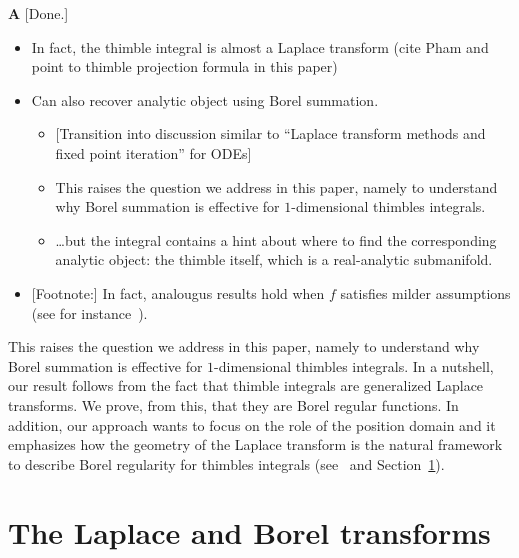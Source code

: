 \documentclass{article}
\theoremstyle{definition}
\theoremstyle{plain}
\newenvironment{todo}{\color{Coral}}{\color{black}}
\newenvironment{brainstorm}{\color{BlueViolet}\begin{itemize}}{\end{itemize}\color{black}}
\newenvironment{draft}{\color{SlateBlue}}{\color{black}}
\begin{document}
\begin{todo}\textbf{A} [Done.]\end{todo}

\begin{brainstorm}
\item In fact, the thimble integral is almost a Laplace transform (cite Pham and point to thimble projection formula in this paper)
\item Can also recover analytic object using Borel summation.
\begin{itemize}
\item {[Transition into discussion similar to ``Laplace transform methods and fixed point iteration'' for ODEs]}
\item This raises the question we address in this paper, namely to understand why Borel summation is effective for $1$-dimensional thimbles integrals.
\item \ldots but the integral contains a hint about where to find the corresponding analytic object: the thimble itself, which is a real-analytic submanifold.
\end{itemize}
\item {[Footnote:]} In fact, analougus results hold when $f$ satisfies milder assumptions (see for instance~\cite[Section 1.2.2]{mistegard_phdthesis}).
\end{brainstorm}

\begin{draft}This raises the question we address in this paper, namely to understand why Borel summation is effective for $1$-dimensional thimbles integrals. In a nutshell, our result follows from the fact that thimble integrals are generalized Laplace transforms. We prove, from this, that they are Borel regular functions. In addition, our approach wants to focus on the role of the position domain and it emphasizes how the geometry of the Laplace transform is the natural framework to describe Borel regularity for thimbles integrals (see~\cite{Fenyes-ihes-lecture} and Section~\ref{sec:Laplace-Borel-general}).\end{draft}
%
\section{The Laplace and Borel transforms}\label{sec:Laplace-Borel-general}
\end{document}
